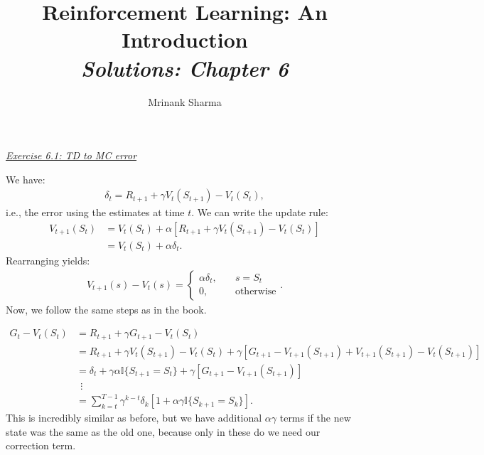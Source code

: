 \documentclass{article}
\title{\textbf{Reinforcement Learning: An Introduction}\\
\textit{Solutions: Chapter 6}
}
\author{Mrinank Sharma}
\newcommand{\myq}[1]{%
	\vspace{1em}
	\noindent\underline{\emph{Exercise #1}}\vspace{0.25em}\linebreak
}
\begin{document}
\maketitle

\myq{6.1: TD to MC error}
We have:
\begin{align}
\delta_t = R_{t+1} + \gamma V_t(S_{t+1}) - V_t(S_t),
\end{align} 
i.e., the error using the estimates at time $t$. We can write the update rule:
\begin{align}
V_{t+1}(S_t) &= V_{t}(S_t) + \alpha [R_{t+1} + \gamma V_{t}(S_{t+1}) - V_t(S_t)] \nonumber \\
&= V_t(S_t) + \alpha \delta_t.
\end{align}
Rearranging yields:
\begin{align}
V_{t+1}(s) - V_t(s) = \begin{cases}
\alpha \delta_t, \quad &s = S_t \\
0, & \text{otherwise}
\end{cases}.
\end{align}
Now, we follow the same steps as in the book. 

\begin{align}
G_t - V_t(S_t) &= R_{t+1} + \gamma G_{t+1} - V_t(S_t) \nonumber \\
&= R_{t+1} + \gamma V_t(S_{t+1}) - V_t(S_t) + \gamma [G_{t+1} - V_{t+1}(S_{t+1}) + V_{t+1}(S_{t+1}) - V_{t}(S_{t+1}) ] \nonumber \\
&= \delta_t + \gamma \alpha \mathbb{I} \lbrace S_{t+1} = S_t\rbrace + \gamma [G_{t+1} - V_{t+1}(S_{t+1})] \nonumber \\
&\ \ \vdots \nonumber \\
&=\sum_{k=t}^{T-1} \gamma^{k-t} \delta_k [1 + \alpha \gamma \mathbb{I} \lbrace S_{k+1} = S_k\rbrace ].
\end{align}
This is incredibly similar as before, but we have additional $\alpha \gamma$ terms if the new state was the same as the old one, because only in these do we need our correction term. 
\end{document}
